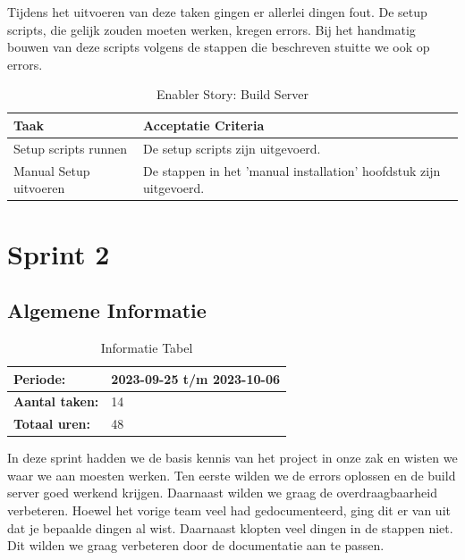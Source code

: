 \documentclass[a4paper]{report}
\newcommand{\enablerstorycolor}{SkyBlue1}
\begin{document}
\begin{tcolorbox}[colback=white, coltitle=black, colframe=\enablerstorycolor, title=\textbf{Enabler Story: }Als developer wil ik een werkende build server\, zodat er gemakkelijk en snel SailfishOS builds gemaakt kunnen worden.]
  Tijdens het uitvoeren van deze taken gingen er allerlei dingen fout. De setup scripts, die gelijk zouden moeten werken, kregen errors. 
  Bij het handmatig bouwen van deze scripts volgens de stappen die beschreven stuitte we ook op errors.
  \begin{table}[H]
      \centering
    \begin{tabularx}{1\textwidth}{|X|X|}
      \hline
      \cellcolor[HTML]{ffcc99} \textbf{Taak} & \cellcolor[HTML]{ffcc99} \textbf{Acceptatie Criteria} \\ 
      \hline
      Setup scripts runnen & De setup scripts zijn uitgevoerd.\\
      \hline
      Manual Setup uitvoeren & De stappen in het 'manual installation' hoofdstuk zijn uitgevoerd.\\
      \hline
      
    \end{tabularx}
    \caption{Enabler Story: Build Server}
  \label{table:it1:story_buildserver}
  \end{table}
  \end{tcolorbox}

\chapter{Sprint 2}
\section{Algemene Informatie}
\begin{table}[H]
  \begin{tabularx}{0.6\textwidth}{|X|X|}
    \hline
    \cellcolor[HTML]{99ccff} \textbf{Periode:} & 2023-09-25 t/m 2023-10-06 \\ 
    \hline
    \cellcolor[HTML]{99ccff} \textbf{Aantal taken:} & 14 \\ 
    \hline
    \cellcolor[HTML]{99ccff} \textbf{Totaal uren:} & 48 \\ 
    \hline
  \end{tabularx}
  \caption{Informatie Tabel}
  \label{table:it2:general}
  \end{table}

In deze sprint hadden we de basis kennis van het project in onze zak en wisten we waar we aan moesten werken.
Ten eerste wilden we de errors oplossen en de build server goed werkend krijgen. Daarnaast wilden we graag de overdraagbaarheid verbeteren.
Hoewel het vorige team veel had gedocumenteerd, ging dit er van uit dat je bepaalde dingen al wist. Daarnaast klopten veel dingen in de stappen niet.
Dit wilden we graag verbeteren door de documentatie aan te passen.
\end{document}
